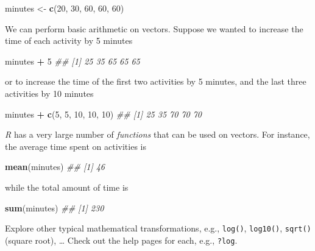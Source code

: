 \documentclass[]{book}
\newenvironment{Shaded}{\begin{snugshade}}{\end{snugshade}}
\newcommand{\CommentTok}[1]{\textcolor[rgb]{0.56,0.35,0.01}{\textit{#1}}}
\newcommand{\DecValTok}[1]{\textcolor[rgb]{0.00,0.00,0.81}{#1}}
\newcommand{\KeywordTok}[1]{\textcolor[rgb]{0.13,0.29,0.53}{\textbf{#1}}}
\newcommand{\NormalTok}[1]{#1}
\newcommand{\OperatorTok}[1]{\textcolor[rgb]{0.81,0.36,0.00}{\textbf{#1}}}
\newcommand{\StringTok}[1]{\textcolor[rgb]{0.31,0.60,0.02}{#1}}
\begin{document}
\begin{Shaded}
\begin{Highlighting}[]
\NormalTok{minutes <-}\StringTok{ }\KeywordTok{c}\NormalTok{(}\DecValTok{20}\NormalTok{, }\DecValTok{30}\NormalTok{, }\DecValTok{60}\NormalTok{, }\DecValTok{60}\NormalTok{, }\DecValTok{60}\NormalTok{)}
\end{Highlighting}
\end{Shaded}

We can perform basic arithmetic on vectors. Suppose we wanted to increase the time of each activity by 5 minutes

\begin{Shaded}
\begin{Highlighting}[]
\NormalTok{minutes }\OperatorTok{+}\StringTok{ }\DecValTok{5}
\CommentTok{## [1] 25 35 65 65 65}
\end{Highlighting}
\end{Shaded}

or to increase the time of the first two activities by 5 minutes, and the last three activities by 10 minutes

\begin{Shaded}
\begin{Highlighting}[]
\NormalTok{minutes }\OperatorTok{+}\StringTok{ }\KeywordTok{c}\NormalTok{(}\DecValTok{5}\NormalTok{, }\DecValTok{5}\NormalTok{, }\DecValTok{10}\NormalTok{, }\DecValTok{10}\NormalTok{, }\DecValTok{10}\NormalTok{)}
\CommentTok{## [1] 25 35 70 70 70}
\end{Highlighting}
\end{Shaded}

\emph{R} has a very large number of \emph{functions} that can be used on vectors. For instance, the average time spent on activities is

\begin{Shaded}
\begin{Highlighting}[]
\KeywordTok{mean}\NormalTok{(minutes)}
\CommentTok{## [1] 46}
\end{Highlighting}
\end{Shaded}

while the total amount of time is

\begin{Shaded}
\begin{Highlighting}[]
\KeywordTok{sum}\NormalTok{(minutes)}
\CommentTok{## [1] 230}
\end{Highlighting}
\end{Shaded}

Explore other typical mathematical transformations, e.g., \texttt{log()}, \texttt{log10()}, \texttt{sqrt()} (square root), \ldots{} Check out the help pages for each, e.g., \texttt{?log}.
\end{document}
